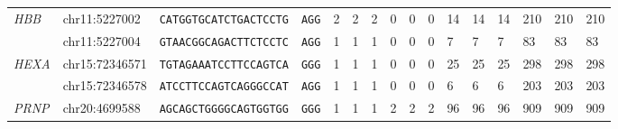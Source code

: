 \documentclass[pdftex,english,10pt]{article}
\begin{document}
{\begin{table}[h]
{\begin{tabular}{|l|lll|llllllllllll|}
\multirow{2}{*}{\textit{HBB}}                       & chr11:5227002                                         & \texttt{CATGGTGCATCTGACTCCTG}                        & \texttt{AGG}              & 2                     &       2                   & \multicolumn{1}{l|}{2}    & 0                     & 0                          & \multicolumn{1}{l|}{0}    & 14                    & 14                         & \multicolumn{1}{l|}{14}    & 210                   &       210                      &      210                     \\
                                           & chr11:5227004                                         & \texttt{GTAACGGCAGACTTCTCCTC}                        & \texttt{AGG}                                       & 1                     &       1                     & \multicolumn{1}{l|}{1}    & 0                     & 0                          & \multicolumn{1}{l|}{0}    & 7                     &    7                        & \multicolumn{1}{l|}{7}    & 83                    &          83                   &     83                     \\ \hline
\multirow{2}{*}{\textit{HEXA}}                      & chr15:72346571                                         & \texttt{TGTAGAAATCCTTCCAGTCA}                        & \texttt{GGG}            & 1                     &           1                 & \multicolumn{1}{l|}{1}    & 0                     &    0                        & \multicolumn{1}{l|}{0}    & 25                    &    25                        & \multicolumn{1}{l|}{25}    & 298                   & 298                          &      298                      \\
                                           & chr15:72346578                                         & \texttt{ATCCTTCCAGTCAGGGCCAT}                        & \texttt{AGG}                                       & 1                     &         1                   & \multicolumn{1}{l|}{1}    & 0                     &        0                    & \multicolumn{1}{l|}{0}   & 6                     &       6                     & \multicolumn{1}{l|}{6}    & 203                   &     203                       &          203                  \\ \hline
\multirow{4}{*}{\textit{PRNP}}                      & chr20:4699588                                         & \texttt{AGCAGCTGGGGCAGTGGTGG}                        & \texttt{GGG}            & 1                     &   1                         & \multicolumn{1}{l|}{1}    & 2                     &        2                    & \multicolumn{1}{l|}{2}    & 96                    &     96                       & \multicolumn{1}{l|}{96}    & 909                   &     909                       &    909                       \\

\end{tabular}}
\end{table}}
\end{document}

